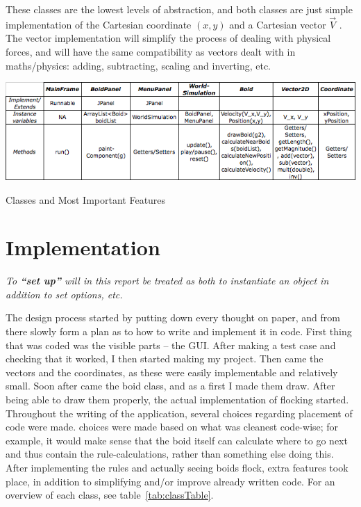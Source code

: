 \documentclass[a4paper,twoside, 10pt]{report}
\begin{document}
These classes are the lowest levels of abstraction, and both classes are just simple implementation of the Cartesian coordinate $(x,y)$ and a Cartesian vector $\vec{V}^{\,~}$. The vector implementation will simplify the process of dealing with  physical forces, and will have the same compatibility as vectors dealt with in maths/physics: adding, subtracting, scaling and inverting, etc. 

\begin{table}[H]
	\includegraphics[width=\textwidth]{images/classOverView.png}
    \caption{Classes and Most Important Features}
    \label{tab:classTable}
\end{table}





\section{Implementation}
\label{sec:implementation}
\begin{description}
	\item \textit{To \textbf{``set up''} will in this report be treated as both to instantiate an object in addition to set options, etc.} 
\end{description}

The design process started by putting down every thought on paper, and from there slowly form a plan as to how to write and implement it in code. First thing that was coded was the visible parts -- the GUI. After making a test case and checking that it worked, I then started making my project. Then came the vectors and the coordinates, as these were easily implementable and relatively small. Soon after came the boid class, and as a first I made them draw. After being able to draw them properly, the actual implementation of flocking started. Throughout the writing of the application, several choices regarding placement of code were made. choices were made based on what was cleanest code-wise; for example, it would make sense that the boid itself can calculate where to go next and thus contain the rule-calculations, rather than something else doing this. After implementing the rules and actually seeing boids flock, extra features took place, in addition to simplifying and/or improve already written code. For an overview of each class, see table~\ref{tab:classTable}.
\end{document}
